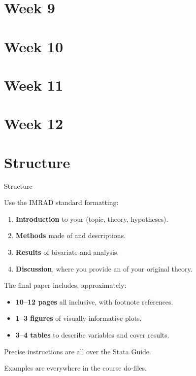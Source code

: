 \documentclass[t]{beamer}
\begin{document}
    \section*{Week 9}


    \section*{Week 10}


    \section*{Week 11}


	\section*{Week 12}

	\section{Structure}
	
	\begin{frame}[t]{Structure}

	Use the IMRAD standard formatting:
		\begin{enumerate}
			\item \textbf{Introduction} to your  (topic, theory, hypotheses).

			\item \textbf{Methods} made of  and  descriptions.
			
			\item \textbf{Results} of bivariate  and  analysis.

			\item \textbf{Discussion}, where you provide an  of your original theory.
		\end{enumerate}

	The final paper includes, approximately:

	\begin{itemize}
		\item \textbf{10--12 pages} all inclusive, with footnote references.
		
		\item \textbf{1--3 figures} of visually informative plots.
		
		\item \textbf{3--4 tables} to describe variables and cover results.
	\end{itemize}
	
	Precise instructions are all over the Stata Guide.
	
	Examples are everywhere in the course do-files.

	\end{frame}
		
\end{document}
